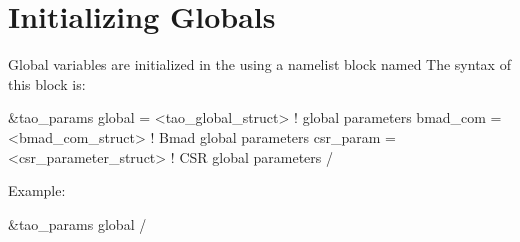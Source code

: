 {{{%
\section{Initializing Globals}
\label{s:globals} 

Global variables are initialized in the  using a
namelist block named  The syntax of this block is:
\begin{example}
  &tao_params
    global        = <tao_global_struct>     ! global parameters
    bmad_com      = <bmad_com_struct>       ! Bmad global parameters
    csr_param     = <csr_parameter_struct>  ! CSR global parameters
  /
\end{example}
Example:
\begin{example}
  &tao_params
    global%
  /
\end{example}

}}}

